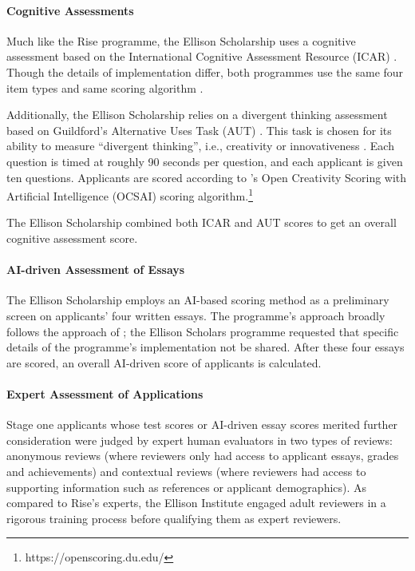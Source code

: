 \paragraph{Cognitive Assessments} 
Much like the Rise programme, the Ellison Scholarship uses a cognitive assessment based on the International Cognitive Assessment Resource (ICAR) \cite{condon2014international,subotic2020psychometric}. Though the details of implementation differ, both programmes use the same four item types and same scoring algorithm \cite{burkner2021bayesian}.

Additionally, the Ellison Scholarship relies on a divergent thinking assessment based on Guildford's Alternative Uses Task (AUT) \cite{guilford1967creativity}. This task is chosen for its ability to measure ``divergent thinking'', i.e., creativity or innovativeness \cite{dumas_measuring_2020,organisciak_beyond_2023}. Each question is timed at roughly 90 seconds per question, and each applicant is given ten questions. Applicants are scored according to \textcite{organisciak_beyond_2023}'s Open Creativity Scoring with Artificial Intelligence (OCSAI) scoring algorithm.\footnote{https://openscoring.du.edu/}

The Ellison Scholarship combined both ICAR and AUT scores to get an overall cognitive assessment score.

\paragraph{AI-driven Assessment of Essays}
The Ellison Scholarship employs an AI-based scoring method as a preliminary screen on applicants' four written essays. The programme's approach broadly follows the approach of \textcite{xiao2024humanaicollaborativeessayscoring}; the Ellison Scholars programme requested that specific details of the programme's implementation not be shared. After these four essays are scored, an overall AI-driven score of applicants is calculated.

\paragraph{Expert Assessment of Applications}
Stage one applicants whose test scores or AI-driven essay scores merited further consideration were judged by expert human evaluators in two types of reviews: anonymous reviews (where reviewers only had access to applicant essays, grades and achievements) and contextual reviews (where reviewers had access to supporting information such as references or applicant demographics). As compared to Rise's experts, the Ellison Institute engaged adult reviewers in a rigorous training process before qualifying them as expert reviewers.

